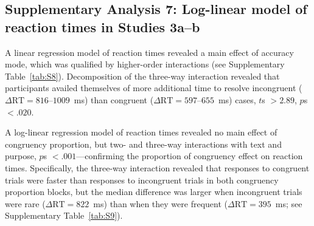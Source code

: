 \documentclass[pdflatex,sn-nature]{sn-jnl}
\begin{document}
\begin{appendices}
\clearpage

\FloatBarrier

\subsection*{Supplementary Analysis 7: Log-linear model of reaction times in Studies 3a--b}
\label{supp:analysis7}

A linear regression model of reaction times revealed a main effect of accuracy mode, which was qualified by higher-order interactions (see Supplementary Table~\ref{tab:S8}). Decomposition of the three-way interaction revealed that participants availed themselves of more additional time to resolve incongruent ($\Delta\mathrm{RT} = 816$--$1009$~ms) than congruent ($\Delta\mathrm{RT} = 597$--$655$~ms) cases, $t$s $> 2.89$, $p$s $< .020$.

A log-linear regression model of reaction times revealed no main effect of congruency proportion, but two- and three-way interactions with text and purpose, $p$s $< .001$---confirming the proportion of congruency effect on reaction times. Specifically, the three-way interaction revealed that responses to congruent trials were faster than responses to incongruent trials in both congruency proportion blocks, but the median difference was larger when incongruent trials were rare ($\Delta\mathrm{RT} = 822$~ms) than when they were frequent ($\Delta\mathrm{RT} = 395$~ms; see Supplementary Table~\ref{tab:S9}).


\end{appendices}
\end{document}
